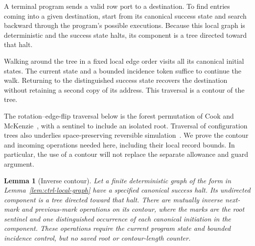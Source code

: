 \documentclass[11pt]{article}
\numberwithin{equation}{section}
\newtheorem{lemma}[theorem]{Lemma}
\theoremstyle{definition}
\theoremstyle{remark}
\begin{document}
A terminal program sends a valid row port to a destination. To find entries coming into a given destination, start from its canonical success state and search backward through the program's possible executions. Because this local graph is deterministic and the success state halts, its component is a tree directed toward that halt.

Walking around the tree in a fixed local edge order visits all its canonical initial states. The current state and a bounded incidence token suffice to continue the walk. Returning to the distinguished success state recovers the destination without retaining a second copy of its address. This traversal is a contour of the tree.

The rotation--edge-flip traversal below is the forest permutation
of Cook and McKenzie~\cite[Proposition~1, p.~387]{CookMcKenzie1987},
with a sentinel to include an isolated root. Traversal of configuration
trees also underlies space-preserving reversible simulation~\cite{LMT2000}.
We prove the contour and
incoming operations needed here, including their local record bounds.
In particular, the use of a contour will not replace the separate
allowance and guard argument.

\begin{lemma}[Inverse contour]\label{lem:ctrl-tour}
Let a finite deterministic graph of the form in
Lemma~\ref{lem:ctrl-local-graph} have a specified canonical success halt.
Its undirected component is a tree directed toward that halt.  There
are mutually inverse next-mark and previous-mark operations on its
contour, where the marks are the root sentinel and one distinguished
occurrence of each canonical initiation in the component.  These
operations require the current program state and bounded incidence
control, but no saved root or contour-length counter.
\end{lemma}
\end{document}
